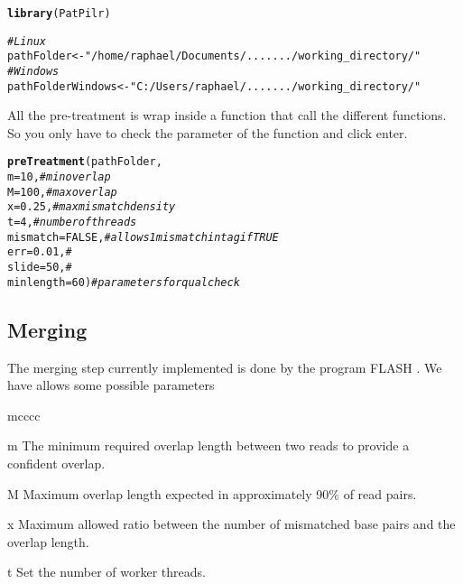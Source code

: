 \documentclass{article}\usepackage[]{graphicx}\usepackage[]{color}
\makeatletter
\newcommand{\hlnum}[1]{\textcolor[rgb]{0.686,0.059,0.569}{#1}}%
\newcommand{\hlstr}[1]{\textcolor[rgb]{0.192,0.494,0.8}{#1}}%
\newcommand{\hlcom}[1]{\textcolor[rgb]{0.678,0.584,0.686}{\textit{#1}}}%
\newcommand{\hlstd}[1]{\textcolor[rgb]{0.345,0.345,0.345}{#1}}%
\newcommand{\hlkwb}[1]{\textcolor[rgb]{0.69,0.353,0.396}{#1}}%
\newcommand{\hlkwc}[1]{\textcolor[rgb]{0.333,0.667,0.333}{#1}}%
\newcommand{\hlkwd}[1]{\textcolor[rgb]{0.737,0.353,0.396}{\textbf{#1}}}%
\newenvironment{kframe}{%
 \def\at@end@of@kframe{}%
 \ifinner\ifhmode%
  \def\at@end@of@kframe{\end{minipage}}%
  \begin{minipage}{\columnwidth}%
 \fi\fi%
 \def\FrameCommand##1{\hskip\@totalleftmargin \hskip-\fboxsep
 \colorbox{shadecolor}{##1}\hskip-\fboxsep
     \hskip-\linewidth \hskip-\@totalleftmargin \hskip\columnwidth}%
 \MakeFramed {\advance\hsize-\width
   \@totalleftmargin\z@ \linewidth\hsize
   \@setminipage}}%
 {\par\unskip\endMakeFramed%
 \at@end@of@kframe}
\newenvironment{knitrout}{}{} %
\makeatother
\begin{document}
\begin{knitrout}
\color{fgcolor}\begin{kframe}
\begin{alltt}
\hlkwd{library}\hlstd{(PatPilr)}

\hlcom{#Linux}
\hlstd{pathFolder} \hlkwb{<-} \hlstr{"/home/raphael/Documents/......./working_directory/"}
\hlcom{#Windows}
\hlstd{pathFolderWindows} \hlkwb{<-} \hlstr{"C:/Users/raphael/......./working_directory/"}
\end{alltt}
\end{kframe}
\end{knitrout}

All the pre-treatment is wrap inside a function that call the different functions. So you only have to check the parameter of the function and click enter.

\begin{knitrout}
\color{fgcolor}\begin{kframe}
\begin{alltt}
\hlkwd{preTreatment}\hlstd{(pathFolder,}
  \hlkwc{m} \hlstd{=} \hlnum{10}\hlstd{,} \hlcom{# min overlap}
  \hlkwc{M} \hlstd{=} \hlnum{100}\hlstd{,} \hlcom{# max overlap}
  \hlkwc{x} \hlstd{=} \hlnum{0.25}\hlstd{,} \hlcom{# max mismatch density}
  \hlkwc{t} \hlstd{=} \hlnum{4}\hlstd{,} \hlcom{# number of threads}
  \hlkwc{mismatch} \hlstd{=} \hlnum{FALSE}\hlstd{,} \hlcom{# allows 1 mismatch in tag if TRUE}
  \hlkwc{err} \hlstd{=} \hlnum{0.01}\hlstd{,} \hlcom{#}
  \hlkwc{slide} \hlstd{=} \hlnum{50}\hlstd{,} \hlcom{#}
  \hlkwc{minlength} \hlstd{=} \hlnum{60}\hlstd{)} \hlcom{# parameters for qual check}
\end{alltt}
\end{kframe}
\end{knitrout}


\subsection{Merging}
\label{subsec:merge}

The merging step currently implemented is done by the program FLASH \cite{Magoc2011}. We have allows some possible parameters

\begin{labeling}{mcccc}
\item [m] The minimum required overlap length between two reads to provide a confident overlap.
\item [M] Maximum overlap length expected in approximately 90\% of read pairs.
\item [x] Maximum allowed ratio between the number of mismatched base pairs and the overlap length.
\item [t] Set the number of worker threads.
\end{labeling}
\end{document}
